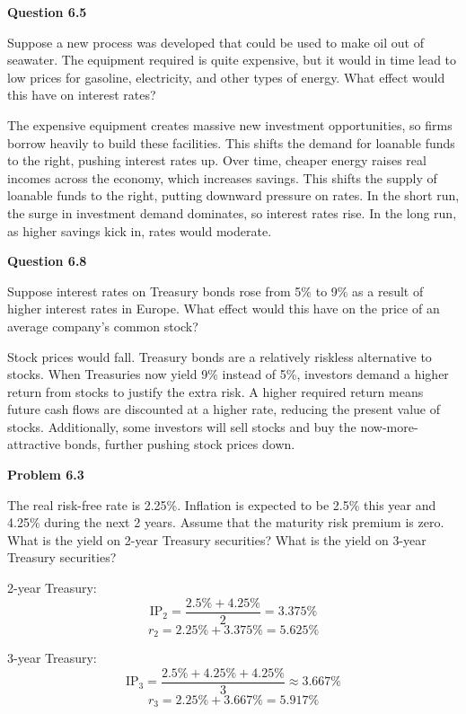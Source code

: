 \documentclass[11pt]{article}
\begin{document}
\textbf{Question 6.5}
\bigskip

Suppose a new process was developed that could be used to make oil out of seawater. The equipment required is quite expensive, but it would in time lead to low prices for gasoline, electricity, and other types of energy. What effect would this have on interest rates?

\bigskip
\bigskip

The expensive equipment creates massive new investment opportunities, so firms borrow heavily to build these facilities. This shifts the demand for loanable funds to the right, pushing interest rates up. Over time, cheaper energy raises real incomes across the economy, which increases savings. This shifts the supply of loanable funds to the right, putting downward pressure on rates. In the short run, the surge in investment demand dominates, so interest rates rise. In the long run, as higher savings kick in, rates would moderate.

\bigskip\bigskip

\textbf{Question 6.8}
\bigskip

Suppose interest rates on Treasury bonds rose from 5\% to 9\% as a result of higher interest rates in Europe. What effect would this have on the price of an average company's common stock?

\bigskip
\bigskip

Stock prices would fall. Treasury bonds are a relatively riskless alternative to stocks. When Treasuries now yield 9\% instead of 5\%, investors demand a higher return from stocks to justify the extra risk. A higher required return means future cash flows are discounted at a higher rate, reducing the present value of stocks. Additionally, some investors will sell stocks and buy the now-more-attractive bonds, further pushing stock prices down.

\bigskip\bigskip

\textbf{Problem 6.3}
\bigskip

The real risk-free rate is 2.25\%. Inflation is expected to be 2.5\% this year and 4.25\% during the next 2 years. Assume that the maturity risk premium is zero. What is the yield on 2-year Treasury securities? What is the yield on 3-year Treasury securities?

\bigskip
\bigskip

2-year Treasury:
\[
\text{IP}_2 = \frac{2.5\% + 4.25\%}{2} = 3.375\%
\]
\[
r_2 = 2.25\% + 3.375\% = \boxed{5.625\%}
\]

3-year Treasury:
\[
\text{IP}_3 = \frac{2.5\% + 4.25\% + 4.25\%}{3} \approx 3.667\%
\]
\[
r_3 = 2.25\% + 3.667\% = \boxed{5.917\%}
\]
\end{document}
